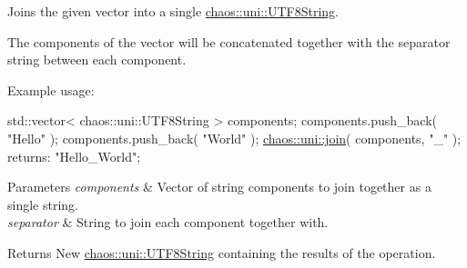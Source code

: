 Joins the given vector into a single \hyperlink{classchaos_1_1uni_1_1_u_t_f8_string}{chaos\+::uni\+::\+U\+T\+F8\+String}. 

The components of the vector will be concatenated together with the separator string between each component.

Example usage\+:


\begin{DoxyCode}
std::vector< chaos::uni::UTF8String > components;
components.push\_back( \textcolor{stringliteral}{"Hello"} );
components.push\_back( \textcolor{stringliteral}{"World"} );
\hyperlink{namespacechaos_1_1uni_ad2a77983423c8b10e2b18cae6f35d329}{chaos::uni::join}( components, \textcolor{stringliteral}{"\_"} ); returns: \textcolor{stringliteral}{"Hello\_World"};
\end{DoxyCode}



\begin{DoxyParams}{Parameters}
{\em components} & Vector of string components to join together as a single string. \\
\hline
{\em separator} & String to join each component together with. \\
\hline
\end{DoxyParams}
\begin{DoxyReturn}{Returns}
New \hyperlink{classchaos_1_1uni_1_1_u_t_f8_string}{chaos\+::uni\+::\+U\+T\+F8\+String} containing the results of the operation. 
\end{DoxyReturn}
